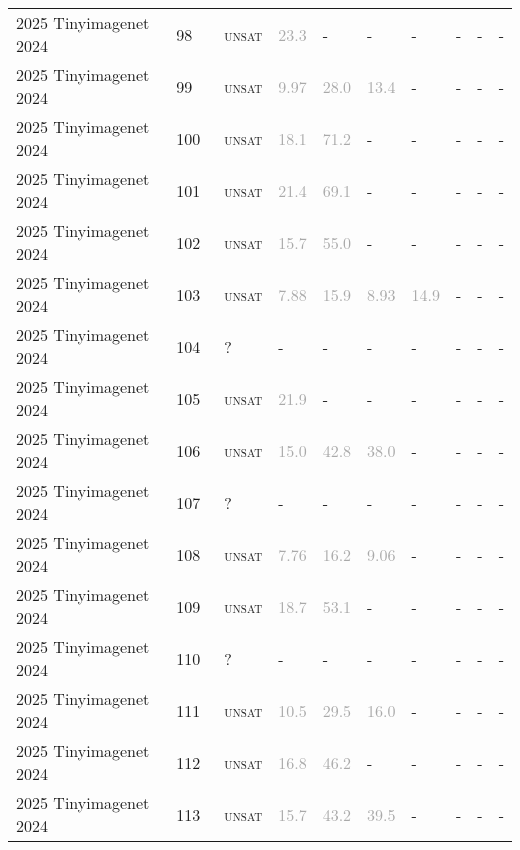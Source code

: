 \begin{center}
{\begin{longtable}{@{}llllllllll@{}}
2025 Tinyimagenet 2024 & 98 & ~\textsc{unsat} & \textcolor{darkgray}{23.3} & - & - & - & - & - & - \\
2025 Tinyimagenet 2024 & 99 & ~\textsc{unsat} & \textcolor{darkgray}{9.97} & \textcolor{darkgray}{28.0} & \textcolor{darkgray}{13.4} & - & - & - & - \\
2025 Tinyimagenet 2024 & 100 & ~\textsc{unsat} & \textcolor{darkgray}{18.1} & \textcolor{darkgray}{71.2} & - & - & - & - & - \\
2025 Tinyimagenet 2024 & 101 & ~\textsc{unsat} & \textcolor{darkgray}{21.4} & \textcolor{darkgray}{69.1} & - & - & - & - & - \\
2025 Tinyimagenet 2024 & 102 & ~\textsc{unsat} & \textcolor{darkgray}{15.7} & \textcolor{darkgray}{55.0} & - & - & - & - & - \\
2025 Tinyimagenet 2024 & 103 & ~\textsc{unsat} & \textcolor{darkgray}{7.88} & \textcolor{darkgray}{15.9} & \textcolor{darkgray}{8.93} & \textcolor{darkgray}{14.9} & - & - & - \\
2025 Tinyimagenet 2024 & 104 & ~? & - & - & - & - & - & - & - \\
2025 Tinyimagenet 2024 & 105 & ~\textsc{unsat} & \textcolor{darkgray}{21.9} & - & - & - & - & - & - \\
2025 Tinyimagenet 2024 & 106 & ~\textsc{unsat} & \textcolor{darkgray}{15.0} & \textcolor{darkgray}{42.8} & \textcolor{darkgray}{38.0} & - & - & - & - \\
2025 Tinyimagenet 2024 & 107 & ~? & - & - & - & - & - & - & - \\
2025 Tinyimagenet 2024 & 108 & ~\textsc{unsat} & \textcolor{darkgray}{7.76} & \textcolor{darkgray}{16.2} & \textcolor{darkgray}{9.06} & - & - & - & - \\
2025 Tinyimagenet 2024 & 109 & ~\textsc{unsat} & \textcolor{darkgray}{18.7} & \textcolor{darkgray}{53.1} & - & - & - & - & - \\
2025 Tinyimagenet 2024 & 110 & ~? & - & - & - & - & - & - & - \\
2025 Tinyimagenet 2024 & 111 & ~\textsc{unsat} & \textcolor{darkgray}{10.5} & \textcolor{darkgray}{29.5} & \textcolor{darkgray}{16.0} & - & - & - & - \\
2025 Tinyimagenet 2024 & 112 & ~\textsc{unsat} & \textcolor{darkgray}{16.8} & \textcolor{darkgray}{46.2} & - & - & - & - & - \\
2025 Tinyimagenet 2024 & 113 & ~\textsc{unsat} & \textcolor{darkgray}{15.7} & \textcolor{darkgray}{43.2} & \textcolor{darkgray}{39.5} & - & - & - & - \\

\end{longtable}}
\end{center}
